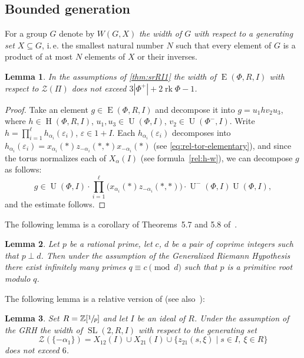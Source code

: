 \documentclass[11pt]{amsart}
\theoremstyle{plain}
\numberwithin{equation}{section}
\newtheorem{lemma}{Lemma}
\numberwithin{lemma}{section}
\theoremstyle{definition}
\theoremstyle{remark}
\DeclareMathOperator{\SL}{SL}
\DeclareMathOperator{\E}{E}
\DeclareMathOperator{\Hh}{H}
\DeclareMathOperator{\U}{U}
\DeclareMathOperator{\rk}{rk}
\begin{document}
\subsection{Bounded generation}\label{sec:boundgen}
For a group $G$ denote by $W(G, X)$ \emph{the width of $G$ with respect to a generating set $X \subseteq G$}, i.\,e. the smallest natural number $N$ 
such that every element of $G$ is a product of at most $N$ elements of $X$ or their inverses.

\begin{lemma}\label{lemma:srRI1_width}
In the assumptions of \cref{thm:srRI1} the width of $\E(\Phi,R,I)$ with respect to $\mathcal{Z}(\Pi)$ does not exceed $3\left|\Phi^+\right|+2\rk\Phi-1$.
\end{lemma}
\begin{proof}
Take an element $g\in\E(\Phi,R,I)$ and decompose it into $g=u_1 h v_2 u_3$, where $h\in\Hh(\Phi,R,I)$, $u_1,u_3\in\U(\Phi,I)$, $v_2\in\U(\Phi^-,I)$. 
Write $h=\prod_{i=1}^\ell h_{\alpha_i}(\varepsilon_i)$, $\varepsilon\in1+I$. 
Each $h_{\alpha_i}(\varepsilon_i)$ decomposes into $h_{\alpha_i}(\varepsilon_i) = x_{\alpha_i}(*) z_{-\alpha_i}(*,*) x_{-\alpha_i}(*)$ 
(see \eqref{eq:rel-tor-elementary}), and since the torus normalizes each of $X_\alpha(I)$ (see formula~\eqref{rel:h-w}), we can decompose $g$ as follows:
\[ g\in\U(\Phi,I)\cdot\prod_{i=1}^\ell\bigl(x_{\alpha_i}(*)z_{-\alpha_i}(*,*)\bigr)\cdot \U^-(\Phi,I) \U(\Phi,I), \]
and the estimate follows.
\end{proof}

The following lemma is a corollary of Theorems~5.7 and 5.8 of~\cite{LSM}.
\begin{lemma}
Let $p$ be a rational prime, let $c$, $d$ be a pair of coprime integers such that $p \perp d$.
Then under the assumption of the Generalized Riemann Hypothesis there exist infinitely many primes $q\equiv c\pmod{d}$ such that $p$ is a primitive root modulo $q$.
\end{lemma}

The following lemma is a relative version of \cite[Lemma~6]{VavSmSuUnitrEng} (see also~\cite{VseUnitrZ1p}):

\begin{lemma}\label{lemma:Z1p}
Set $R=\mathbb{Z}[\sfrac{1}{p}]$ and let $I$ be an ideal of $R$.
Under the assumption of the GRH the width of $\SL(2, R, I)$ with respect to the generating set
\[ \mathcal{Z}(\{-\alpha_1\})=X_{12}(I)\cup X_{21}(I) \cup \{z_{21}(s, \xi) \mid s\in I,\ \xi\in R\} \]
does not exceed $6$.
\end{lemma}
\end{document}
